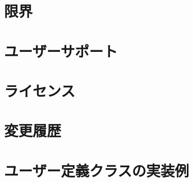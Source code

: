 \documentclass[12pt,a4paper]{jarticle}
\begin{document}
\section{限界}
\label{sec:limitation}



\newpage

\section{ユーザーサポート}
\label{sec:usersupport}



\newpage

\section{ライセンス}
\label{sec:license}



\newpage

\section{変更履歴}
\label{sec:changelog}




\newpage

\appendix


\section{ユーザー定義クラスの実装例}
\label{sec:example_userdefined}


\end{document}
